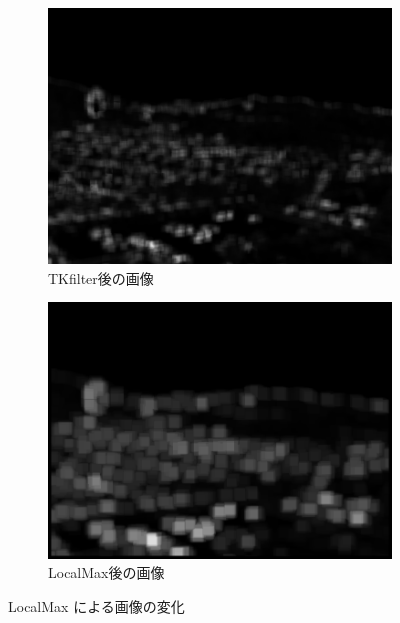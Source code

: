 \documentclass[autodetect-engine,dvi=dvipdfmx,ja=standard,
               a4j,11pt]{bxjsarticle}
\begin{document}
\begin{figure}[h]
 \centering
 \begin{subfigure}[b]{0.45\textwidth}
   \centering
   \includegraphics[scale=0.2]{5.2_TKfilter.png}
   \caption{TKfilter後の画像}
   \label{fig:5.2_TKfilter.png}
 \end{subfigure}
 \hspace{5mm}
 \begin{subfigure}[b]{0.45\textwidth}
   \centering
   \includegraphics[scale=0.2]{5.2_LocalMax.png}
   \caption{LocalMax後の画像}
   \label{fig:5.2_LocalMax.png}
 \end{subfigure}
 \caption{LocalMax による画像の変化}
 \label{fig:comparison_W}
\end{figure}
\end{document}

